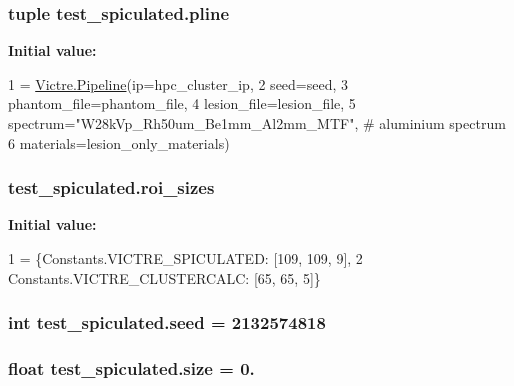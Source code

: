 \hypertarget{namespacetest__spiculated_a2691d025d2f4ab43907a58fd9bbf3c50}{
\subsubsection[{pline}]{\setlength{\rightskip}{0pt plus 5cm}tuple test\-\_\-spiculated.\-pline}}\label{namespacetest__spiculated_a2691d025d2f4ab43907a58fd9bbf3c50}
{\bfseries Initial value\-:}
\begin{DoxyCode}
1 = \hyperlink{namespaceVictre_1_1Pipeline}{Victre.Pipeline}(ip=hpc\_cluster\_ip,
2                         seed=seed,
3                         phantom\_file=phantom\_file,
4                         lesion\_file=lesion\_file,
5                         spectrum=\textcolor{stringliteral}{"W28kVp\_Rh50um\_Be1mm\_Al2mm\_MTF"},  \textcolor{comment}{# aluminium spectrum}
6                         materials=lesion\_only\_materials)
\end{DoxyCode}
\hypertarget{namespacetest__spiculated_aee77941f94eca1ddc6507a6dc644320e}{
\subsubsection[{roi\-\_\-sizes}]{\setlength{\rightskip}{0pt plus 5cm}test\-\_\-spiculated.\-roi\-\_\-sizes}}\label{namespacetest__spiculated_aee77941f94eca1ddc6507a6dc644320e}
{\bfseries Initial value\-:}
\begin{DoxyCode}
1 = \{Constants.VICTRE\_SPICULATED: [109, 109, 9],
2              Constants.VICTRE\_CLUSTERCALC: [65, 65, 5]\}
\end{DoxyCode}
\hypertarget{namespacetest__spiculated_ae23883f2f949cd553bd4b1df786aefce}{
\subsubsection[{seed}]{\setlength{\rightskip}{0pt plus 5cm}int test\-\_\-spiculated.\-seed = 2132574818}}\label{namespacetest__spiculated_ae23883f2f949cd553bd4b1df786aefce}
\hypertarget{namespacetest__spiculated_a40ff806ed0a1985c23f9ee4d5ee829de}{
\subsubsection[{size}]{\setlength{\rightskip}{0pt plus 5cm}float test\-\_\-spiculated.\-size = 0.}}\label{namespacetest__spiculated_a40ff806ed0a1985c23f9ee4d5ee829de}
